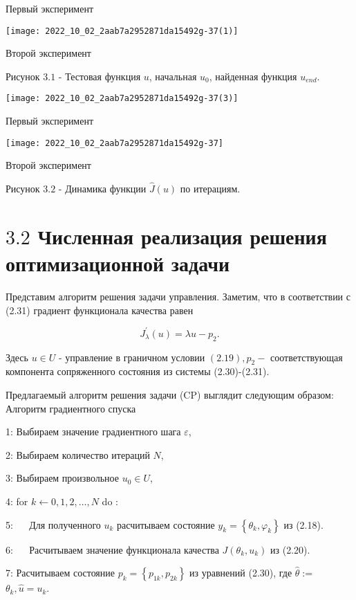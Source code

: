 \documentclass[10pt]{article}
\begin{document}
Первый эксперимент

\begin{center}
\texttt{[image: 2022\_10\_02\_2aab7a2952871da15492g-37(1)]}
\end{center}

Второй эксперимент

Рисунок $3.1$ - Тестовая функция $u$, начальная $u_{0}$, найденная функция $u_{e n d}$.

\begin{center}
\texttt{[image: 2022\_10\_02\_2aab7a2952871da15492g-37(3)]}
\end{center}

Первый эксперимент

\begin{center}
\texttt{[image: 2022\_10\_02\_2aab7a2952871da15492g-37]}
\end{center}

Второй эксперимент

Рисунок $3.2$ - Динамика функции $\hat{J}(u)$ по итерациям.

\section{$3.2$ Численная реализация решения оптимизационной задачи}
Представим алгоритм решения задачи управления. Заметим, что в соответствии с (2.31) градиент функционала качества равен

$$
J_{\lambda}^{\prime}(u)=\lambda u-p_{2} .
$$

Здесь $u \in U$ - управление в граничном условии $(2.19), p_{2}-$ соответствующая компонента сопряженного состояния из системы (2.30)-(2.31).

Предлагаемый алгоритм решения задачи (CP) выглядит следующим образом: Алгоритм градиентного спуска

1: Выбираем значение градиентного шага $\varepsilon$,

2: Выбираем количество итераций $N$,

3: Выбираем произвольное $u_{0} \in U$,

4: for $k \leftarrow 0,1,2, \ldots, N$ do :

5: $\quad$ Для полученного $u_{k}$ расчитываем состояние $y_{k}=\left\{\theta_{k}, \varphi_{k}\right\}$ из (2.18).

6: $\quad$ Расчитываем значение функционала качества $J\left(\theta_{k}, u_{k}\right)$ из (2.20).

7: Расчитываем состояние $p_{k}=\left\{p_{1 k}, p_{2 k}\right\}$ из уравнений (2.30), где $\hat{\theta}:=$ $\theta_{k}, \hat{u}=u_{k}$.
\end{document}
